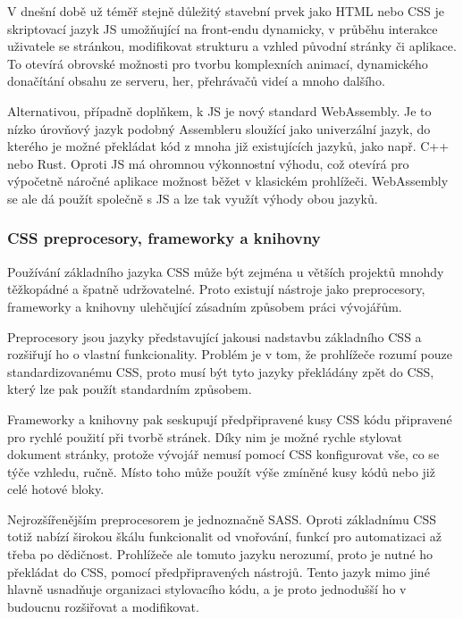 		V dnešní době už téměř stejně důležitý stavební prvek jako \Ac{HTML} nebo \Ac{CSS} je skriptovací jazyk \ac{JS}
		umožňující na front-endu dynamicky, v průběhu interakce uživatele se stránkou, modifikovat strukturu a vzhled
		původní stránky či aplikace.
		To otevírá obrovské možnosti pro tvorbu komplexních animací, dynamického donačítání obsahu ze serveru, her, přehrávačů
		videí a mnoho dalšího. \cite{what_is_javascript}

		Alternativou, případně doplňkem, k \ac{JS} je nový standard WebAssembly.
		Je to nízko úrovňový jazyk podobný Assembleru sloužící jako univerzální jazyk, do kterého je možné překládat
		kód z mnoha již existujících jazyků, jako např. C++ nebo Rust.
		Oproti \ac{JS} má ohromnou výkonnostní výhodu, což otevírá pro výpočetně náročné aplikace možnost běžet
		v klasickém prohlížeči.
		WebAssembly se ale dá použít společně s \ac{JS} a lze tak využít výhody obou jazyků. \cite{webassembly}

		\subsubsection{CSS preprocesory, frameworky a knihovny}

		Používání základního jazyka \Ac{CSS} může být zejména u větších projektů mnohdy těžkopádné a špatně udržovatelné.
		Proto existují nástroje jako preprocesory, frameworky a knihovny ulehčující zásadním způsobem práci vývojářům.

		Preprocesory jsou jazyky představující jakousi nadstavbu základního \Ac{CSS} a rozšiřují ho o vlastní
		funkcionality.
		Problém je v tom, že prohlížeče rozumí pouze standardizovanému \Ac{CSS}, proto musí být tyto jazyky překládány
		zpět do \Ac{CSS}, který lze pak použít standardním způsobem.

		Frameworky a knihovny pak seskupují předpřipravené kusy \Ac{CSS} kódu připravené pro rychlé použití při tvorbě stránek.
		Díky nim je možné rychle stylovat dokument stránky, protože vývojář nemusí pomocí \Ac{CSS} konfigurovat vše, co se
		týče vzhledu, ručně.
		Místo toho může použít výše zmíněné kusy kódů nebo již celé hotové bloky.

		Nejrozšířenějším preprocesorem je jednoznačně \Ac{SASS}.
		Oproti základnímu \Ac{CSS} totiž nabízí širokou škálu funkcionalit od vnořování, funkcí pro automatizaci až třeba
		po dědičnost.
		Prohlížeče ale tomuto jazyku nerozumí, proto je nutné ho překládat do \Ac{CSS}, pomocí předpřipravených nástrojů.
		Tento jazyk mimo jiné hlavně usnadňuje organizaci stylovacího kódu, a je proto jednodušší ho v budoucnu rozšiřovat a
		modifikovat. \cite{learn_sass}

